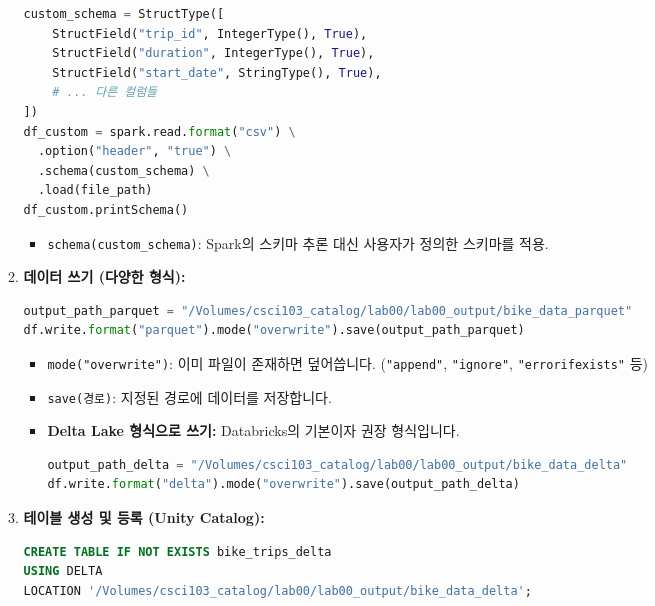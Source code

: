 \documentclass[11pt,a4paper]{article}
\theoremstyle{definition}
\begin{document}
\begin{itemize}
\begin{enumerate}
\begin{lstlisting}[language=python, caption={스키마 수동 정의 예시}]
custom_schema = StructType([
    StructField("trip_id", IntegerType(), True),
    StructField("duration", IntegerType(), True),
    StructField("start_date", StringType(), True),
    # ... 다른 컬럼들
])
df_custom = spark.read.format("csv") \
  .option("header", "true") \
  .schema(custom_schema) \
  .load(file_path)
df_custom.printSchema()
        \end{lstlisting}
        \begin{itemize}
            \item \texttt{schema(custom_schema)}: Spark의 스키마 추론 대신 사용자가 정의한 스키마를 적용.
        \end{itemize}
    \item \textbf{데이터 쓰기 (다양한 형식):}
        \begin{lstlisting}[language=python, caption={데이터를 Parquet 형식으로 쓰기 예시}]
output_path_parquet = "/Volumes/csci103_catalog/lab00/lab00_output/bike_data_parquet"
df.write.format("parquet").mode("overwrite").save(output_path_parquet)
        \end{lstlisting}
        \begin{itemize}
            \item \texttt{mode("overwrite")}: 이미 파일이 존재하면 덮어씁니다. (\texttt{"append"}, \texttt{"ignore"}, \texttt{"errorifexists"} 등)
            \item \texttt{save(경로)}: 지정된 경로에 데이터를 저장합니다.
            \item \textbf{Delta Lake 형식으로 쓰기:} Databricks의 기본이자 권장 형식입니다.
                \begin{lstlisting}[language=python, caption={데이터를 Delta 형식으로 쓰기 예시}]
output_path_delta = "/Volumes/csci103_catalog/lab00/lab00_output/bike_data_delta"
df.write.format("delta").mode("overwrite").save(output_path_delta)
                \end{lstlisting}
        \end{itemize}
    \item \textbf{테이블 생성 및 등록 (Unity Catalog):}
        \begin{lstlisting}[language=sql, caption={Delta 테이블 생성 및 등록 예시}]
%sql
CREATE TABLE IF NOT EXISTS bike_trips_delta
USING DELTA
LOCATION '/Volumes/csci103_catalog/lab00/lab00_output/bike_data_delta';


\end{lstlisting}
\end{enumerate}
\end{itemize}
\end{document}
